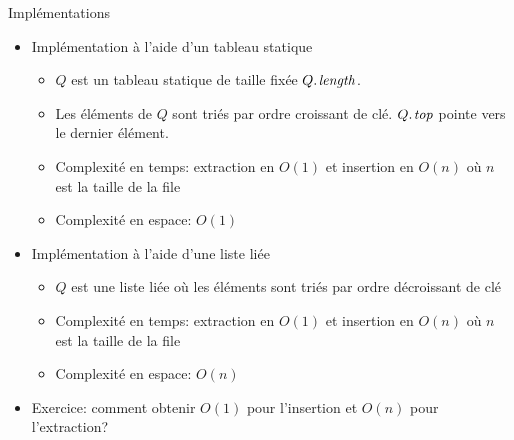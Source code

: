 \begin{frame}{Implémentations}
\begin{itemize}
\item Implémentation à l'aide d'un tableau statique
\begin{itemize}
\item $Q$ est un tableau statique de taille fixée $\attrib{Q}{length}$.
\item Les éléments de $Q$ sont triés par ordre \alert{croissant} de clé. $\attrib{Q}{top}$ pointe vers le dernier élément.
\item Complexité en temps: extraction en $O(1)$ et insertion en $O(n)$ où $n$ est la taille de la file
\item Complexité en espace: $O(1)$
\end{itemize}
\item Implémentation à l'aide d'une liste liée
\begin{itemize}
\item $Q$ est une liste liée où les éléments sont triés par ordre \alert{décroissant} de clé
\item Complexité en temps: extraction en $O(1)$ et insertion en $O(n)$ où $n$ est la taille de la file
\item Complexité en espace: $O(n)$
\end{itemize}
\item Exercice: comment obtenir $O(1)$ pour l'insertion et $O(n)$ pour l'extraction?
\end{itemize}
\end{frame}

